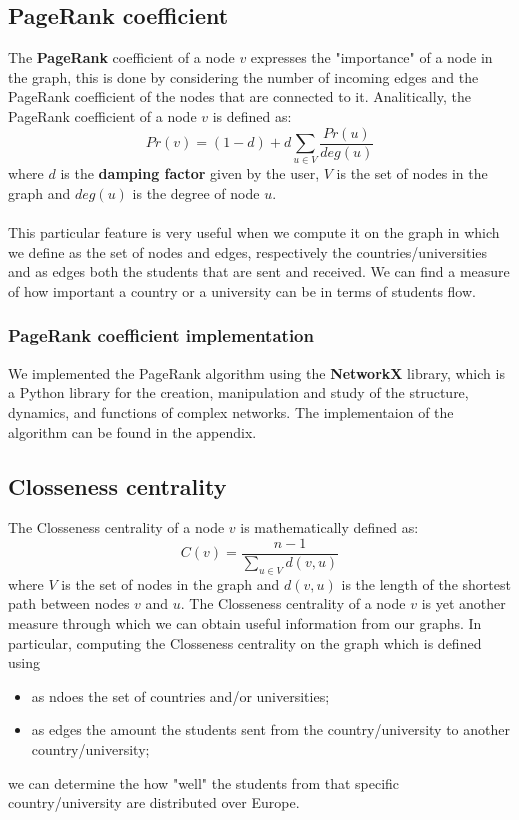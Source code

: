     \subsection*{PageRank coefficient}

    The \textbf{PageRank} coefficient of a node $v$ expresses the "importance" of a node in the graph, this is done by considering the 
    number of incoming edges and the PageRank coefficient of the nodes that are connected to it. Analitically, the PageRank coefficient of a node $v$ is defined as:
    \begin{equation}
        Pr(v) = (1-d) + d \sum_{u \in V} \frac{Pr(u)}{deg(u)}
    \end{equation}
    where $d$ is the \textbf{damping factor} given by the user, $V$ is the set of nodes in the graph and $deg(u)$ is the degree of node $u$.
    \\\\
    This particular feature is very useful when we compute it on the graph in which we define as the set of nodes and edges, respectively the 
    countries/universities and as edges both the students that are sent and received. We can find a measure of how important a country or a 
    university can be in terms of students flow.
    \subsubsection*{PageRank coefficient implementation}
    We implemented the PageRank algorithm using the \textbf{NetworkX} library, which is a Python library for the creation, 
    manipulation and study of the structure, dynamics, and functions of complex networks. The implementaion of the algorithm can be found in the appendix.

    \subsection*{Closseness centrality}
    The Closseness centrality of a node $v$ is mathematically defined as:
    \begin{equation}
        C(v) = \frac{n-1}{\sum_{u \in V} d(v, u)}
    \end{equation}
    where $V$ is the set of nodes in the graph and $d(v, u)$ is the length of the shortest path between nodes $v$ and $u$.
    The Closseness centrality of a node $v$ is yet another measure through which we can obtain useful information from our graphs. In particular, 
    computing the Closseness centrality on the graph which is defined using 
    \begin{itemize}
        \item as ndoes the set of countries and/or universities;
        \item as edges the amount the students sent from the country/university to another country/university;
    \end{itemize}
    we can determine the how "well" the students from that specific country/university are distributed over Europe.
